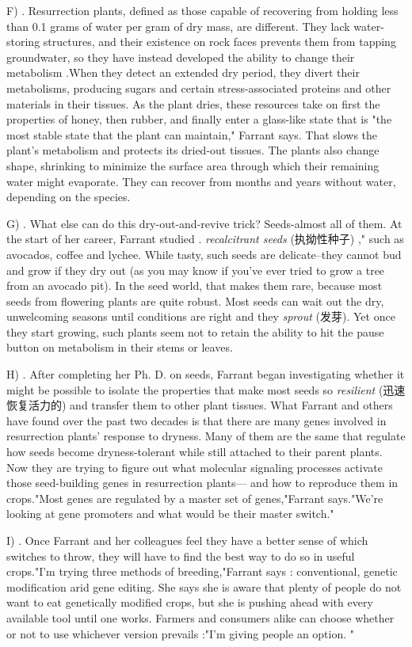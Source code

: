 \documentclass[UTF8,11pt]{ctexart}
\begin{document}
F) . Resurrection plants, defined as those capable of recovering from holding less than 0.1 grams of water per gram of dry mass, are different. They lack water-storing structures, and their existence on rock faces prevents them from tapping groundwater, so they have instead developed the ability to change their metabolism .When they detect an extended dry period, they divert their metabolisms, producing sugars and certain stress-associated proteins and other materials in their tissues. As the plant dries, these resources take on first the properties of honey, then rubber, and finally enter a glass-like state that is "the most stable state that the plant can maintain," Farrant says. That slows the plant's metabolism and protects its dried-out tissues. The plants also change shape, shrinking to minimize the surface area through which their remaining water might evaporate. They can recover from months and years without water, depending on the species.


G) . What else can do this dry-out-and-revive trick? Seeds-almost all of them. At the start of her career, Farrant studied .\textit{ recalcitrant seeds} (执拗性种子) ," such as avocados, coffee and lychee. While tasty, such seeds are delicate--they cannot bud and grow if they dry out (as you may know if you've ever tried to grow a tree from an avocado pit). In the seed world, that makes them rare, because most seeds from flowering plants are quite robust. Most seeds can wait out the dry, unwelcoming seasons until conditions are right and they\textit{ sprout} (发芽). Yet once they start growing, such plants seem not to retain the ability to hit the pause button on metabolism in their stems or leaves.


H) . After completing her Ph. D. on seeds, Farrant began investigating whether it might be possible to isolate the properties that make most seeds so\textit{ resilient} (迅速恢复活力的) and transfer them to other plant tissues. What Farrant and others have found over the past two decades is that there are many genes involved in resurrection plants' response to dryness. Many of them are the same that regulate how seeds become dryness-tolerant while still attached to their parent plants. Now they are trying to figure out what molecular signaling processes activate those seed-building genes in resurrection plants— and how to reproduce them in crops."Most genes are regulated by a master set of genes,"Farrant says."We're looking at gene promoters and what would be their master switch."


I) . Once Farrant and her colleagues feel they have a better sense of which switches to throw, they will have to find the best way to do so in useful crops."I'm trying three methods of breeding,"Farrant says : conventional, genetic modification arid gene editing. She says she is aware that plenty of people do not want to eat genetically modified crops, but she is pushing ahead with every available tool until one works. Farmers and consumers alike can choose whether or not to use whichever version prevails :"I'm giving people an option. "
\end{document}
